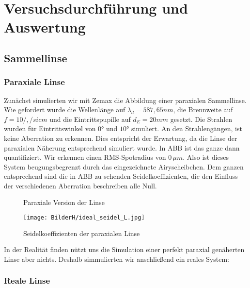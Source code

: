 \documentclass[twoside,colorback,accentcolor=tud4c,11pt]{tudreport}
\begin{document}
\chapter{Versuchsdurchführung und Auswertung}
	\section{Sammellinse}
		\subsection{Paraxiale Linse}
		
		Zunächst simulierten wir mit Zemax die Abbildung einer paraxialen Sammellinse. Wie gefordert wurde die Wellenlänge auf $\lambda_d = 587,65 nm$, die Brennweite auf $f = 10 /, /si{cm}$ und die Eintrittspupille auf $d_E = 20 mm$ gesetzt. Die Strahlen wurden für Eintrittswinkel von $0°$ und $10°$ simuliert. An den Strahlengängen, ist keine Aberration zu erkennen. Dies entspricht der Erwartung, da die Linse der paraxialen Näherung entsprechend simuliert wurde. In ABB ist das ganze dann quantifiziert. Wir erkennen einen RMS-Spotradius von $0 \, \mu m$. Also ist dieses System beugungsbegrenzt durch das eingezeichnete Airyscheibchen. Dem ganzen entsprechend sind die in ABB zu sehenden Seidelkoeffizienten, die den Einfluss der verschiedenen Aberration beschreiben alle Null. 
		
	\begin{figure}[H]
\centering
  \quad
  \quad   
  \caption{Paraxiale Version der Linse}
\end{figure}		
		
\begin{figure}[H]
\centering
   	\begin{minipage}[b]{\textwidth}
 \centering  	\texttt{[image: BilderH/ideal\_seidel\_L.jpg]}
   	\caption{Seidelkoeffizienten der paraxialen Linse}
  	\end{minipage}
\end{figure}		
		
		In der Realität finden nützt uns die Simulation einer perfekt paraxial genäherten Linse aber nichts. Deshalb simmulierten wir anschließend ein reales System:
		
		\subsection{Reale Linse}
		
\end{document}
